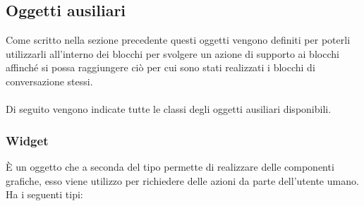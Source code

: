\subsection{Oggetti ausiliari}
Come scritto nella sezione precedente questi oggetti vengono definiti per poterli utilizzarli all'interno dei blocchi per svolgere un azione di supporto ai blocchi affinché si possa raggiungere ciò per cui sono stati realizzati i blocchi di conversazione stessi.\\
\\
Di seguito vengono indicate tutte le classi degli oggetti ausiliari disponibili.

\subsubsection*{Widget}
È un oggetto che a seconda del tipo permette di realizzare delle componenti grafiche, esso viene utilizzo per richiedere delle azioni da parte dell’utente umano.
Ha i seguenti tipi:
